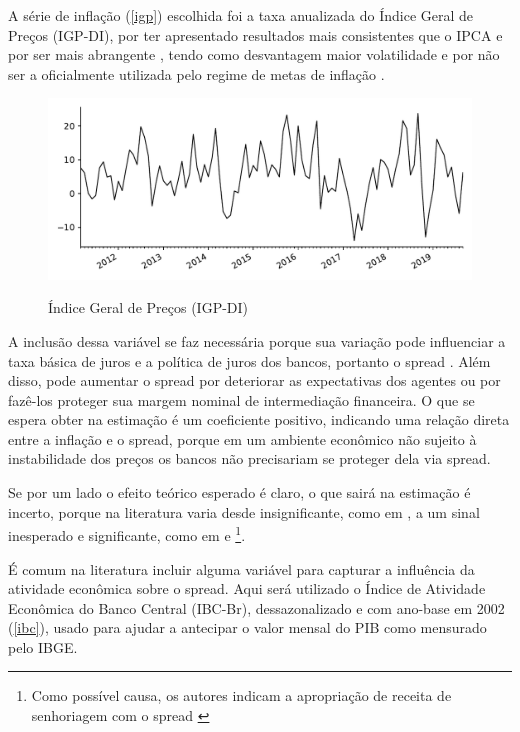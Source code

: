\documentclass[a4paper,
               article,
               12pt,
               openany,
               oneside,
               english,
               brazil]{abntex2}
\numberwithin{equation}{section}
\begin{document}
    A série de inflação (\autoref{igp}) escolhida foi a taxa anualizada do Índice Geral de Preços (IGP-DI), por ter apresentado resultados mais consistentes que o IPCA \cite[p.~66]{rocha09} e por ser mais abrangente \cite[p.~21]{afanasieff02}, tendo como desvantagem maior volatilidade e por não ser a oficialmente utilizada pelo regime de metas de inflação \cite[23]{chaim}.

\begin{figure}[h]
  \centering
    \caption{Índice Geral de Preços (IGP-DI)}
      \includegraphics[width = \textwidth, scale=0.75]{igp.pdf}
      \label{igp}
\end{figure}
    
    A inclusão dessa variável se faz necessária porque sua variação pode influenciar a taxa básica de juros e a política de juros dos bancos, portanto o spread \cite[p.~14]{bignotto06}. Além disso, pode aumentar o spread por deteriorar as expectativas dos agentes ou por fazê-los proteger sua margem nominal de intermediação financeira. O que se espera obter na estimação é um coeficiente positivo, indicando uma relação direta entre a inflação e o spread, porque em um ambiente econômico não sujeito à instabilidade dos preços os bancos não precisariam se proteger dela via spread. 
    
    Se por um lado o efeito teórico esperado é claro, o que sairá na estimação é incerto, porque na literatura varia desde insignificante, como em \textcite{oreiro}, a um sinal inesperado e significante, como em \textcite{bignotto06} e \textcite{afanasieff02}\footnote{Como possível causa, os autores indicam a apropriação de receita de senhoriagem com o spread \cite[p.~25]{afanasieff02}}.
    
    É comum na literatura incluir alguma variável para capturar a influência da atividade econômica sobre o spread. Aqui será utilizado o Índice de Atividade Econômica do Banco Central (IBC-Br), dessazonalizado e com ano-base em 2002 (\autoref{ibc}), usado para ajudar a antecipar o valor mensal do PIB como mensurado pelo IBGE.
\end{document}
